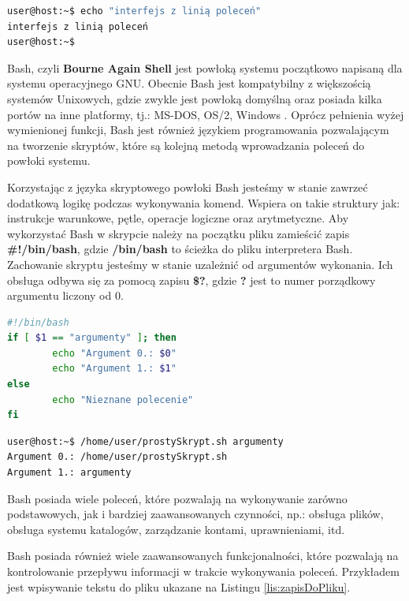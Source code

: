 \begin{lstlisting}[language=bash,style=Cmd,caption={Komenda wypisująca tekst na standardowe wyjście wykonana z linii poleceń}]
user@host:~$ echo "interfejs z linią poleceń"
interfejs z linią poleceń
user@host:~$
\end{lstlisting}

Bash, czyli \textbf{Bourne Again Shell} jest powłoką systemu początkowo napisaną dla systemu operacyjnego GNU. Obecnie Bash jest kompatybilny z większością systemów Unixowych, gdzie zwykle jest powłoką domyślną oraz posiada kilka portów na inne platformy, tj.: MS-DOS, OS/2, Windows \cite{BashMan}. Oprócz pełnienia wyżej wymienionej funkcji, Bash jest również językiem programowania pozwalającym na tworzenie skryptów, które są kolejną metodą wprowadzania poleceń do powłoki systemu.\par
Korzystając z języka skryptowego powłoki Bash jesteśmy w stanie zawrzeć dodatkową logikę podczas wykonywania komend. Wspiera on takie struktury jak: instrukcje warunkowe, pętle, operacje logiczne oraz arytmetyczne. Aby wykorzystać Bash w skrypcie należy na początku pliku zamieścić zapis \textbf{\#!/bin/bash}, gdzie \textbf{/bin/bash} to ścieżka do pliku interpretera Bash. Zachowanie skryptu jesteśmy w stanie uzależnić od argumentów wykonania. Ich obsługa odbywa się za pomocą zapisu \textbf{\$?}, gdzie \textbf{?} jest to numer porządkowy argumentu liczony od 0.

\begin{lstlisting}[label={lst:prostySkrypt},language=bash,caption={Skrypt wykorzystujący argumenty wejściowe, instrukcję warunkową oraz polecenie echo}]
#!/bin/bash
if [ $1 == "argumenty" ]; then
        echo "Argument 0.: $0"
        echo "Argument 1.: $1"
else
        echo "Nieznane polecenie"
fi
\end{lstlisting}

\begin{lstlisting}[language=bash,style=Cmd,caption={Przykład działania Skryptu z Listingu \ref{lst:prostySkrypt}}]
user@host:~$ /home/user/prostySkrypt.sh argumenty
Argument 0.: /home/user/prostySkrypt.sh
Argument 1.: argumenty
\end{lstlisting}

Bash posiada wiele poleceń, które pozwalają na wykonywanie zarówno podstawowych, jak i bardziej zaawansowanych czynności, np.: obsługa plików, obsługa systemu katalogów, zarządzanie kontami, uprawnieniami, itd.\par
Bash posiada również wiele zaawansowanych funkcjonalności, które pozwalają na kontrolowanie przepływu informacji w trakcie wykonywania poleceń. Przykładem jest wpisywanie tekstu do pliku ukazane na Listingu \ref{lis:zapisDoPliku}.

